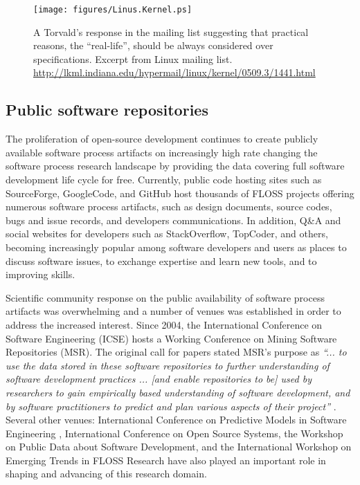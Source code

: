 \begin{figure}[ht!]
   \centering
   \texttt{[image: figures/Linus.Kernel.ps]}
   \caption{A Torvald's response in the mailing list suggesting that practical reasons, the ``real-life'', 
   should be always considered over specifications.
   Excerpt from Linux mailing list. \url{http://lkml.indiana.edu/hypermail/linux/kernel/0509.3/1441.html}}
   \label{fig:kernel}
\end{figure}

\subsection{Public software repositories}
The proliferation of open-source development continues to create publicly available software process 
artifacts on increasingly high rate changing the software process research landscape by providing 
the data covering full software development life cycle for free. 
Currently, public code hosting sites such as SourceForge, GoogleCode, and GitHub host thousands of FLOSS 
projects offering numerous software process artifacts, such as design documents, source codes, bugs and 
issue records, and developers communications.
In addition, Q\&A and social websites for developers such as StackOverflow, TopCoder, and others, becoming 
increasingly popular among software developers and users as places to discuss software issues, 
to exchange expertise and learn new tools, and to improving skills.

Scientific community response on the public availability of software process artifacts was overwhelming 
and a number of venues was established in order to address the increased interest. 
Since 2004, the International Conference on Software Engineering (ICSE) hosts a Working Conference on 
Mining Software Repositories (MSR). The original call for papers stated MSR's purpose as 
\textit{``... to use the data stored in these software repositories to further understanding of software 
development practices ... [and enable repositories to be] used by researchers to gain empirically based 
understanding of software development, and by software practitioners to predict and plan various aspects 
of their project''} \cite{msr2004} \cite{citeulike:7853299}. 
Several other venues: International Conference on Predictive Models in Software Engineering \cite{promise12}, 
International Conference on Open Source Systems, the Workshop on Public Data about Software Development, 
and the International Workshop on Emerging Trends in FLOSS Research have also played
an important role in shaping and advancing of this research domain.

